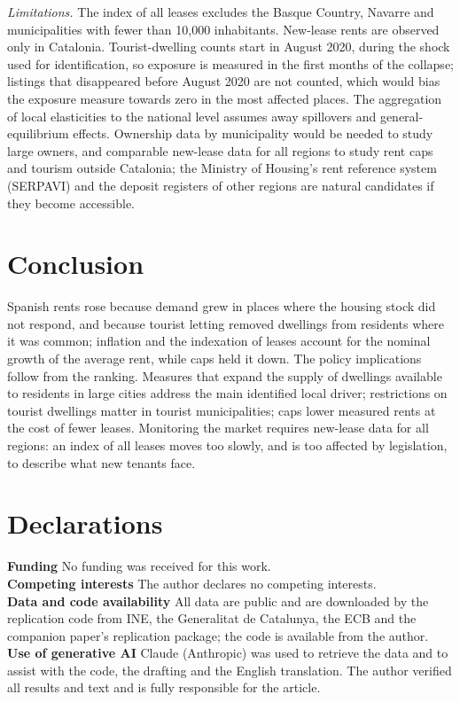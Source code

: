 \documentclass[11pt,a4paper]{article}
\begin{document}
\textit{Limitations.} The index of all leases excludes the Basque Country, Navarre and municipalities with fewer than 10,000 inhabitants. New-lease rents are observed only in Catalonia. Tourist-dwelling counts start in August 2020, during the shock used for identification, so exposure is measured in the first months of the collapse; listings that disappeared before August 2020 are not counted, which would bias the exposure measure towards zero in the most affected places. The aggregation of local elasticities to the national level assumes away spillovers and general-equilibrium effects. Ownership data by municipality would be needed to study large owners, and comparable new-lease data for all regions to study rent caps and tourism outside Catalonia; the Ministry of Housing's rent reference system (SERPAVI) and the deposit registers of other regions are natural candidates if they become accessible.

\section{Conclusion}\label{sec:conclusion}

Spanish rents rose because demand grew in places where the housing stock did not respond, and because tourist letting removed dwellings from residents where it was common; inflation and the indexation of leases account for the nominal growth of the average rent, while caps held it down. The policy implications follow from the ranking. Measures that expand the supply of dwellings available to residents in large cities address the main identified local driver; restrictions on tourist dwellings matter in tourist municipalities; caps lower measured rents at the cost of fewer leases. Monitoring the market requires new-lease data for all regions: an index of all leases moves too slowly, and is too affected by legislation, to describe what new tenants face.

\section*{Declarations}
\noindent\textbf{Funding} No funding was received for this work.\\
\textbf{Competing interests} The author declares no competing interests.\\
\textbf{Data and code availability} All data are public and are downloaded by the replication code from INE, the Generalitat de Catalunya, the ECB and the companion paper's replication package; the code is available from the author.\\
\textbf{Use of generative AI} Claude (Anthropic) was used to retrieve the data and to assist with the code, the drafting and the English translation. The author verified all results and text and is fully responsible for the article.


\end{document}

